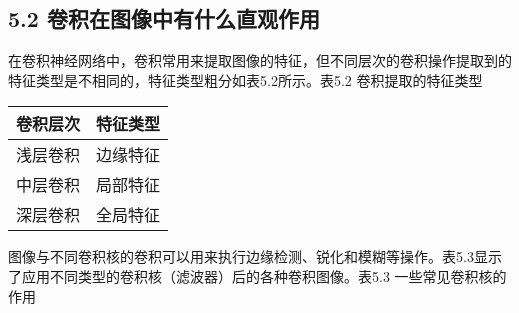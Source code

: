 \subsection{5.2
卷积在图像中有什么直观作用}\label{ux5377ux79efux5728ux56feux50cfux4e2dux6709ux4ec0ux4e48ux76f4ux89c2ux4f5cux7528}

​
在卷积神经网络中，卷积常用来提取图像的特征，但不同层次的卷积操作提取到的特征类型是不相同的，特征类型粗分如表5.2所示。
​ 表5.2 卷积提取的特征类型

\begin{longtable}[]{ cc }
\toprule
卷积层次 & 特征类型\tabularnewline
\midrule
\endhead
浅层卷积 & 边缘特征\tabularnewline
中层卷积 & 局部特征\tabularnewline
深层卷积 & 全局特征\tabularnewline
\bottomrule
\end{longtable}

图像与不同卷积核的卷积可以用来执行边缘检测、锐化和模糊等操作。表5.3显示了应用不同类型的卷积核（滤波器）后的各种卷积图像。
​ 表5.3 一些常见卷积核的作用

